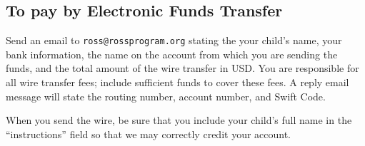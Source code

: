 \documentclass[11pt]{ross}
\begin{document}
\subsection*{To pay by Electronic Funds Transfer}

Send an email to \texttt{ross@rossprogram.org} stating the your
child's name, your bank information, the name on the account from
which you are sending the funds, and the total amount of the wire
transfer in USD. You are responsible for all wire transfer fees;
include sufficient funds to cover these fees.  A reply email message
will state the routing number, account number, and Swift Code.

When you send the wire, be sure that you include your child's full
name in the ``instructions'' field so that we may correctly credit
your account.
\end{document}
